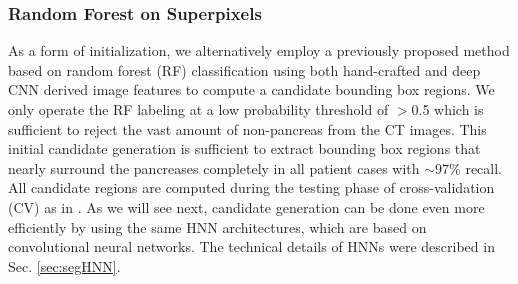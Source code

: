 \documentclass[journal]{IEEEtran}
\begin{document}
\subsubsection{Random Forest on Superpixels}
\label{sec:region_candidates_RF}
As a form of initialization, we alternatively employ a previously proposed method based on random forest (RF) classification \cite{farag2014bottom,roth2015deeporgan} using both hand-crafted and deep CNN derived image features to compute a candidate bounding box regions. We only operate the RF labeling at a low probability threshold of $>$0.5 which is sufficient to reject the vast amount of non-pancreas from the CT images. This initial candidate generation is sufficient to extract bounding box regions that nearly surround the pancreases completely in all patient cases with $\sim97$\% recall. All candidate regions are computed during the testing phase of cross-validation (CV) as in \cite{roth2015deeporgan}.   
As we will see next, candidate generation can be done even more efficiently by using the same HNN architectures, which are based on convolutional neural networks. The technical details of HNNs were described in Sec. \ref{sec:segHNN}. 
\end{document}
